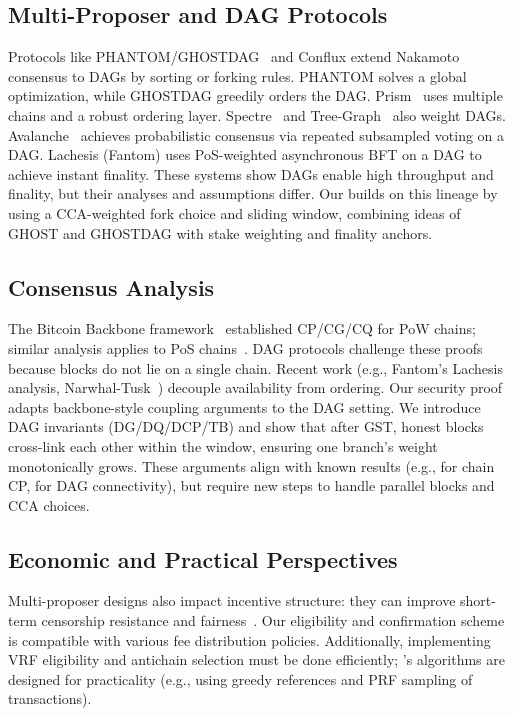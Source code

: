 \subsection{Multi-Proposer and DAG Protocols}
Protocols like PHANTOM/GHOSTDAG~\cite{AFT:SWZ21} and Conflux extend Nakamoto consensus to DAGs by sorting or forking rules. PHANTOM solves a global optimization, while GHOSTDAG greedily orders the DAG. Prism~\cite{Prism} uses multiple chains and a robust ordering layer. Spectre~\cite{EPRINT:MorKulYok18} and Tree-Graph~\cite{EPRINT:ZhaChaLeo18} also weight DAGs. Avalanche~\cite{SnowFamily} achieves probabilistic consensus via repeated subsampled voting on a DAG. Lachesis (Fantom) uses PoS-weighted asynchronous BFT on a DAG to achieve instant finality. These systems show DAGs enable high throughput and finality, but their analyses and assumptions differ. Our \Proj builds on this lineage by using a CCA-weighted fork choice and sliding window, combining ideas of GHOST and GHOSTDAG with stake weighting and finality anchors. %

\subsection{Consensus Analysis}
The Bitcoin Backbone framework~\cite{EC:GarKiaLeo15} established CP/CG/CQ for PoW chains; similar analysis applies to PoS chains~\cite{EC:PasSeeShe17}. DAG protocols challenge these proofs because blocks do not lie on a single chain. Recent work (e.g., Fantom's Lachesis analysis, Narwhal-Tusk~\cite{NarwhalTusk}) decouple availability from ordering. Our security proof adapts backbone-style coupling arguments to the DAG setting. We introduce DAG invariants (DG/DQ/DCP/TB) and show that after GST, honest blocks cross-link each other within the window, ensuring one branch's weight monotonically grows. These arguments align with known results (e.g., \cite{EC:GarKiaLeo15} for chain CP, \cite{AFT:SWZ21} for DAG connectivity), but require new steps to handle parallel blocks and CCA choices.

\subsection{Economic and Practical Perspectives}
Multi-proposer designs also impact incentive structure: they can improve short-term censorship resistance and fairness~\cite{FOCIL, multiFee}. Our eligibility and confirmation scheme is compatible with various fee distribution policies. Additionally, implementing VRF eligibility and antichain selection must be done efficiently; \ProjBase's algorithms are designed for practicality (e.g., using greedy references and PRF sampling of transactions).



